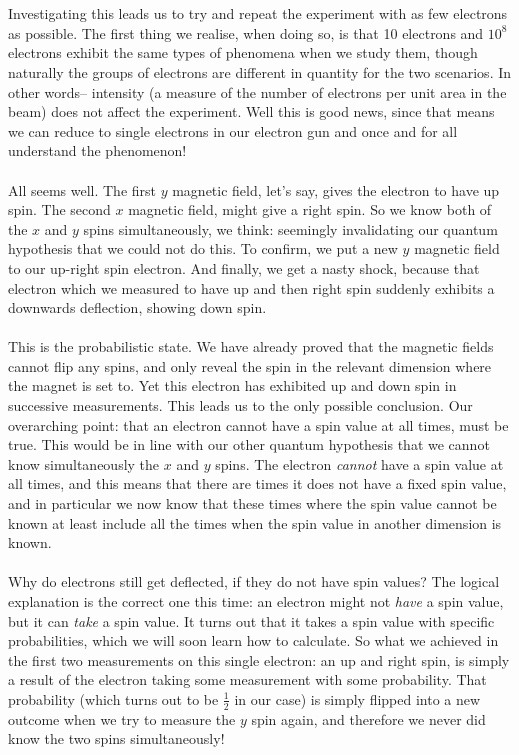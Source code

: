 \\\\
Investigating this leads us to try and repeat the experiment with as few electrons as possible.
The first thing we realise, when doing so, is that 10 electrons and $10^8$ electrons exhibit the same types of phenomena when we study them, though naturally the groups of electrons are different in quantity for the two scenarios. In other words-- intensity (a measure of the number of electrons per unit area in the beam) does not affect the experiment. Well this is good news, since that means we can reduce to single electrons in our electron gun and once and for all understand the phenomenon!
\\\\
All seems well. The first $y$ magnetic field, let's say, gives the electron to have up spin. The second $x$ magnetic field, might give a right spin. So we know both of the $x$ and $y$ spins simultaneously, we think: seemingly invalidating our quantum hypothesis that we could not do this. To confirm, we put a new $y$ magnetic field to our up-right spin electron. And finally, we get a nasty shock, because that electron which we measured to have up and then right spin suddenly exhibits a downwards deflection, showing down spin.
\\\\
This is the probabilistic state. We have already proved that the magnetic fields cannot flip any spins, and only reveal the spin in the relevant dimension where the magnet is set to. Yet this electron has exhibited up and down spin in successive measurements. This leads us to the only possible conclusion. Our overarching point: that an electron cannot have a spin value at all times, must be true. This would be in line with our other quantum hypothesis that we cannot know simultaneously the $x$ and $y$ spins. The electron \textit{cannot} have a spin value at all times, and this means that there are times it does not have a fixed spin value, and in particular we now know that these times where the spin value cannot be known at least include all the times when the spin value in another dimension is known.
\\\\
Why do electrons still get deflected, if they do not have spin values? The logical explanation is the correct one this time: an electron might not \textit{have} a spin value, but it can \textit{take} a spin value. It turns out that it takes a spin value with specific probabilities, which we will soon learn how to calculate. So what we achieved in the first two measurements on this single electron: an up and right spin, is simply a result of the electron taking some measurement with some probability. That probability (which turns out to be $\frac{1}{2}$ in our case) is simply flipped into a new outcome when we try to measure the $y$ spin again, and therefore we never did know the two spins simultaneously!
